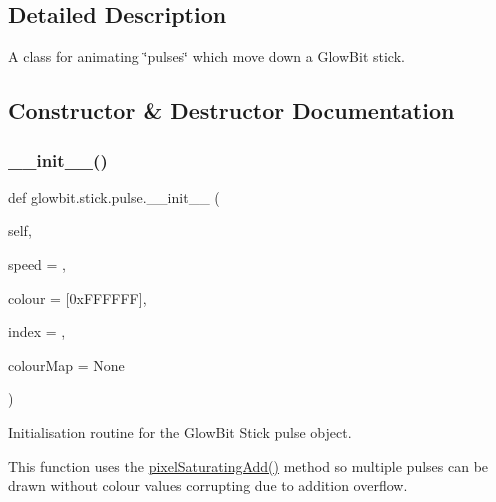 \subsection{Detailed Description}
A class for animating \char`\"{}pulses\char`\"{} which move down a Glow\+Bit stick. 



\subsection{Constructor \& Destructor Documentation}
\mbox{\label{classglowbit_1_1stick_1_1pulse_a53a1dbcea6d84002f76f9c10c7ae0481}} 
\subsubsection{\texorpdfstring{\+\_\+\+\_\+init\+\_\+\+\_\+()}{\_\_init\_\_()}}
{\footnotesize\ttfamily def glowbit.\+stick.\+pulse.\+\_\+\+\_\+init\+\_\+\+\_\+ (\begin{DoxyParamCaption}\item[{}]{self,  }\item[{}]{speed = {},  }\item[{}]{colour = {\ttfamily \mbox{[}0xFFFFFF\mbox{]}},  }\item[{}]{index = {},  }\item[{}]{colour\+Map = {\ttfamily None} }\end{DoxyParamCaption})}



Initialisation routine for the Glow\+Bit Stick pulse object. 

This function uses the \hyperlink{classglowbit_1_1glowbit_a0db675789faef3399ffb2c1213c12048}{pixel\+Saturating\+Add()} method so multiple pulses can be drawn without colour values corrupting due to addition overflow.


